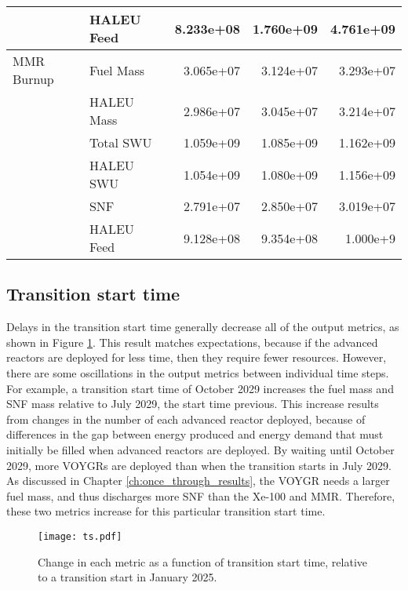 \begin{table}[ht!]
\begin{tabular}{llrrr}
                      & HALEU Feed & 8.233e+08 & 1.760e+09 & 4.761e+09 \\\hline 
        MMR Burnup &  Fuel Mass & 3.065e+07 & 3.124e+07 & 3.293e+07 \\
                   & HALEU Mass & 2.986e+07 & 3.045e+07 & 3.214e+07 \\
                   &  Total SWU & 1.059e+09 & 1.085e+09 & 1.162e+09 \\
                   &  HALEU SWU & 1.054e+09 & 1.080e+09 & 1.156e+09 \\
                   &        SNF & 2.791e+07 & 2.850e+07 & 3.019e+07 \\
                   & HALEU Feed & 9.128e+08 & 9.354e+08 & 1.000e+9 \\
        \hline
    \end{tabular}
\end{table}


\subsection{Transition start time}
Delays in the transition start time generally decrease all of the output 
metrics, as shown in Figure \ref{fig:ts_scenario7}. This result matches 
expectations, because if the advanced reactors are deployed for less time, 
then they require fewer resources. However, there are some oscillations in 
the output metrics between individual time steps. For example, a transition 
start time of October 2029 increases the fuel mass and \gls{SNF} mass 
relative to July 2029, the start time previous. This increase results 
from changes in the number 
of each advanced reactor deployed, because of differences in the gap 
between energy produced and energy demand that must initially be filled when 
advanced reactors are deployed. By waiting until October 2029, more VOYGRs 
are deployed than when the transition starts in July 2029. As discussed in 
Chapter \ref{ch:once_through_results}, the VOYGR needs a larger fuel mass, 
and thus discharges more \gls{SNF} than the Xe-100 and \gls{MMR}. Therefore, 
these two metrics increase for this particular transition start time. 

\begin{figure}[h!]
    \centering
    \texttt{[image: ts.pdf]}
    \caption{Change in each metric as a function of transition start 
    time, relative to a transition start in January 2025.}
    \label{fig:ts_scenario7}
\end{figure}

